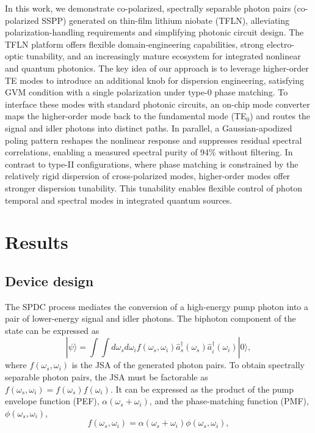 \documentclass[aps, amsmath, amssymb,reprint,superscriptaddress]{revtex4-2}
\begin{document}
In this work, we demonstrate co-polarized, spectrally separable photon pairs (co-polarized SSPP) generated on thin-film lithium niobate (TFLN), alleviating polarization-handling requirements and simplifying photonic circuit design. The TFLN platform offers flexible domain-engineering capabilities\cite{wangcoptica2018}, strong electro-optic tunability\cite{zhudilight,zhudireview}, and an increasingly mature ecosystem for integrated nonlinear and quantum photonics\cite{2020PRL}. The key idea of our approach is to leverage higher-order TE modes to introduce an additional knob for dispersion engineering, satisfying GVM condition with a single polarization under type-0 phase matching. To interface these modes with standard photonic circuits, an on-chip mode converter maps the higher-order mode back to the fundamental mode (TE$_0$) and routes the signal and idler photons into distinct paths. In parallel, a Gaussian-apodized poling pattern reshapes the nonlinear response and suppresses residual spectral correlations, enabling a measured spectral purity of 94\% without filtering. In contrast to type-II configurations, where phase matching is constrained by the relatively rigid dispersion of cross-polarized modes, higher-order modes offer stronger dispersion tunability. This tunability enables flexible control of photon temporal and spectral modes in integrated quantum sources.

\section{Results}

\subsection{Device design}
The SPDC process mediates the conversion of a high-energy pump photon into a pair of lower-energy signal and idler photons. The biphoton component of the state can be expressed as
\begin{equation}
|\psi \rangle = \int\int d\omega_s d\omega_i f(\omega_s,\omega_i)
\hat{a}_s^\dagger(\omega_s)\hat{a}_i^\dagger(\omega_i)|0\rangle ,
\end{equation}
where $f(\omega_s,\omega_i)$ is the JSA of the generated photon pairs.
To obtain spectrally separable photon pairs, the JSA must be factorable as $f(\omega_s,\omega_i)=f(\omega_s)f(\omega_i)$. It can be expressed as the product of the pump envelope function (PEF), $\alpha(\omega_s+\omega_i)$, and the phase-matching function (PMF), $\phi(\omega_s,\omega_i)$\cite{2006generation},
\begin{equation}
f(\omega_s,\omega_i)=\alpha(\omega_s+\omega_i)\phi(\omega_s,\omega_i),
\end{equation}
\end{document}
